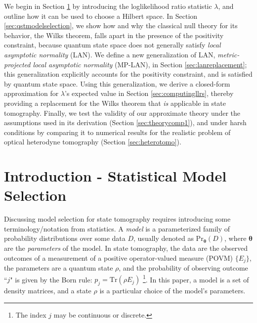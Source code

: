 \documentclass[aps,pra, twocolumn]{revtex4-1}
\newcommand{\bs}[1]{\boldsymbol{#1}}
\begin{document}
We begin in Section \ref{sec:intro} by introducing the loglikelihood ratio statistic $\lambda$, and outline how it can be used to choose a Hilbert space.  In Section \ref{sec:qstmodelselection}, we show how and why the classical null theory for its behavior, the Wilks theorem, falls apart in the presence of the positivity constraint, because quantum state space does not generally satisfy \emph{local asymptotic normality} (LAN).  We define a new generalization of LAN, \emph{metric-projected local asymptotic normality} (MP-LAN), in Section \ref{sec:lanreplacement}; this generalization explicitly accounts for the positivity constraint, and is satisfied by quantum state space. Using this generalization, we derive a closed-form approximation for $\lambda$'s expected value in Section \ref{sec:computingllrs}, thereby providing a replacement for the Wilks theorem that \emph{is} applicable in state tomography.  Finally, we test the validity of our approximate theory under the assumptions used in its derivation (Section \ref{sec:theorycomp1}), and under harsh conditions by comparing it to numerical results for the realistic problem of optical heterodyne tomography (Section \ref{sec:heterotomo}).

\section{Introduction - Statistical Model Selection}
\label{sec:intro}
Discussing model selection for state tomography requires introducing some terminology/notation from statistics.  A \emph{model} is a parameterized family of probability distributions over some data $D$, usually denoted as $\mathrm{Pr}_{\bs{\theta}}(D)$, where $\bs{\theta}$ are the \emph{parameters} of the model. In state tomography, the data are the observed outcomes of a measurement of a positive operator-valued measure (POVM) $\{E_{j}\}$, the parameters are a quantum state $\rho$, and the probability of observing outcome ``$j$" is given by the Born rule: $p_{j} = \mathrm{Tr}(\rho E_{j})$ \footnote{The index $j$ may be continuous or discrete.}. In this paper, a model is a set of density matrices, and a state $\rho$ is a particular choice of the model's parameters.
\end{document}
